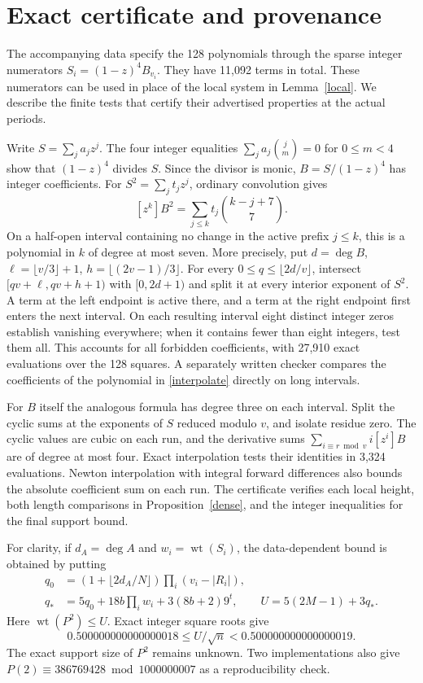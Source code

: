 \documentclass[10pt,a4paper,reqno]{amsart}
\newcommand{\wt}{\operatorname{wt}}
\begin{document}
\section{Exact certificate and provenance}\label{sec:cert}
The accompanying data specify the 128 polynomials through the sparse integer numerators $S_i=(1-z)^4B_{v_i}$. They have 11,092 terms in total. These numerators can be used in place of the local system in Lemma~\ref{local}. We describe the finite tests that certify their advertised properties at the actual periods.

Write $S=\sum_j a_jz^j$. The four integer equalities $\sum_j a_j\binom jm=0$ for $0\le m<4$ show that $(1-z)^4$ divides $S$. Since the divisor is monic, $B=S/(1-z)^4$ has integer coefficients. For $S^2=\sum_j t_j z^j$, ordinary convolution gives
\begin{equation}\label{interpolate}
                     [z^k]B^2=\sum_{j\le k}t_j\binom{k-j+7}{7}.
\end{equation}
On a half-open interval containing no change in the active prefix $j\le k$, this is a polynomial in $k$ of degree at most seven. More precisely, put $d=\deg B$, $\ell=\lfloor v/3\rfloor+1$, $h=\lfloor(2v-1)/3\rfloor$. For every $0\le q\le\lfloor2d/v\rfloor$, intersect $[qv+\ell,qv+h+1)$ with $[0,2d+1)$ and split it at every interior exponent of $S^2$. A term at the left endpoint is active there, and a term at the right endpoint first enters the next interval. On each resulting interval eight distinct integer zeros establish vanishing everywhere; when it contains fewer than eight integers, test them all. This accounts for all forbidden coefficients, with 27,910 exact evaluations over the 128 squares. A separately written checker compares the coefficients of the polynomial in \eqref{interpolate} directly on long intervals.

For $B$ itself the analogous formula has degree three on each interval. Split the cyclic sums at the exponents of $S$ reduced modulo $v$, and isolate residue zero. The cyclic values are cubic on each run, and the derivative sums $\sum_{i\equiv r\bmod v}i[z^i]B$ are of degree at most four. Exact interpolation tests their identities in 3,324 evaluations. Newton interpolation with integral forward differences also bounds the absolute coefficient sum on each run. The certificate verifies each local height, both length comparisons in Proposition~\ref{dense}, and the integer inequalities for the final support bound.

For clarity, if $d_A=\deg A$ and $w_i=\wt(S_i)$, the data-dependent bound is obtained by putting
\begin{align*}
 q_0&=(1+\lfloor2d_A/N\rfloor)\prod_i(v_i-|R_i|),\\
 q_*&=5q_0+18b\prod_i w_i+3(8b+2)9^t,\qquad
 U=5(2M-1)+3q_* .
\end{align*}
Here $\wt(P^2)\le U$. Exact integer square roots give
\[
           0.500000000000000018\le U/\sqrt n<0.500000000000000019 .
\]
The exact support size of $P^2$ remains unknown. Two implementations also give $P(2)\equiv386769428\bmod 1000000007$ as a reproducibility check.
\end{document}
